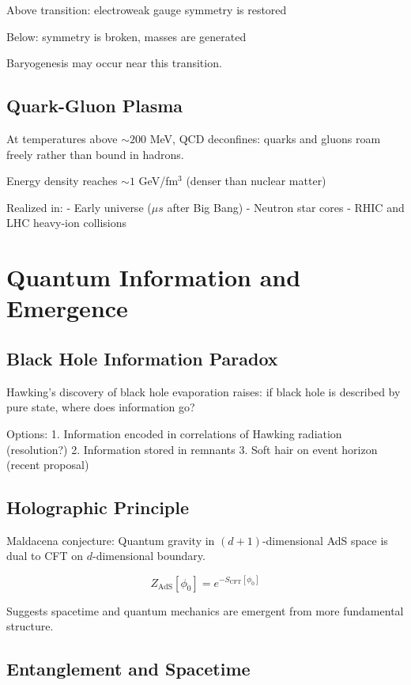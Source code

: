 \documentclass[12pt,openany,oneside]{book}
\begin{document}
{{{{Above transition: electroweak gauge symmetry is restored

Below: symmetry is broken, masses are generated

Baryogenesis may occur near this transition.

\subsection{Quark-Gluon Plasma}

At temperatures above $\sim 200$ MeV, QCD deconfines: quarks and gluons roam freely rather than bound in hadrons.

Energy density reaches $\sim 1$ GeV/fm$^3$ (denser than nuclear matter)

Realized in:
- Early universe ($\mu s$ after Big Bang)
- Neutron star cores
- RHIC and LHC heavy-ion collisions

\section{Quantum Information and Emergence}

\subsection{Black Hole Information Paradox}

Hawking's discovery of black hole evaporation raises: if black hole is described by pure state, where does information go?

Options:
1. Information encoded in correlations of Hawking radiation (resolution?)
2. Information stored in remnants
3. Soft hair on event horizon (recent proposal)

\subsection{Holographic Principle}

Maldacena conjecture: Quantum gravity in $(d+1)$-dimensional AdS space is dual to CFT on $d$-dimensional boundary.

\[
Z_{\text{AdS}}[\phi_0] = e^{-S_{\text{CFT}}[\phi_0]}
\]

Suggests spacetime and quantum mechanics are emergent from more fundamental structure.

\subsection{Entanglement and Spacetime}

}}}}
\end{document}
